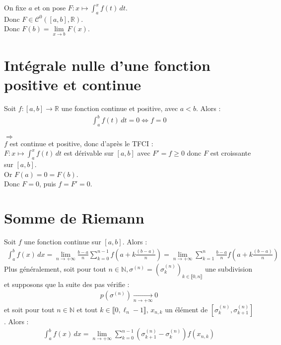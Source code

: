 \documentclass[../main.tex]{subfiles}
\begin{document}
\noindent On fixe $a$ et on pose $F:x\mapsto \int_{a}^{x} f(t) \,dt$. \\
Donc $F\in \mathcal{C}^0([a, b], \mathbb{R})$. \\
Donc $F(b) = \lim\limits_{x\to b} F(x)$. 

\section{Intégrale nulle d'une fonction positive et continue}
\begin{tcolorbox}[title=Propostion 26.69, title filled=false, colframe=lightblue, colback=lightblue!10!white]
    Soit $f:[a, b]\to \mathbb{R}$ une fonction continue et positive, avec $a < b$. Alors : 
    \begin{align*}
        \int_{a}^{b} f(t) \,dt = 0 \Leftrightarrow f = 0
    \end{align*}
\end{tcolorbox}

$\boxed{\Rightarrow}$ \\
$f$ est continue et positive, donc d'après le TFCI : \\
$F:x\mapsto \int_{a}^{x} f(t) \,dt$ est dérivable sur $[a, b]$ avec $F' = f \geq 0$ donc $F$ est croissante sur $[a, b]$. \\
Or $F(a) = 0 = F(b)$. \\
Donc $F = 0$, puis $f = F' = 0$. 

\section{Somme de Riemann}
\begin{tcolorbox}[title=Théorème 26.70, title filled=false, colframe=orange, colback=orange!10!white]
    Soit $f$ une fonction continue sur $[a, b]$. Alors : 
    \begin{align*}
        \int_{a}^{b} f(x) \,dx = \lim_{n\to +\infty} \frac{b - a}{n} \sum_{k=0}^{n-1} f\left(a + k\frac{(b-a)}{n}\right) = \lim_{n\to +\infty} \sum_{k=1}^{n} \frac{b-a}{n} f\left(a + k\frac{(b-a)}{n}\right) 
    \end{align*}
    Plus généralement, soit pour tout $n\in \mathbb{N}, \sigma^{(n)} = (\sigma^{(n)}_k)_{k\in \llbracket 0, n \rrbracket}$ une subdivision et supposons que la suite des pas vérifie : 
    \begin{align*}
        p(\sigma^{(n)}) \underset{n \to +\infty}{\longrightarrow} 0
    \end{align*}
    et soit pour tout $n\in \mathbb{N}$ et tout $k\in \llbracket 0, \ell_n - 1 \rrbracket$, $x_{n,k}$ un élément de $[\sigma_k^{(n)}, \sigma_{k+1}^{(n)}]$. Alors :
    \begin{align*}
        \int_{a}^{b} f(x) \,dx = \lim_{n\to +\infty} \sum_{k=0}^{n-1} (\sigma_{k+1}^{(n)} - \sigma_k^{(n)}) f(x_{n,k}) 
    \end{align*}
\end{tcolorbox}
\end{document}
